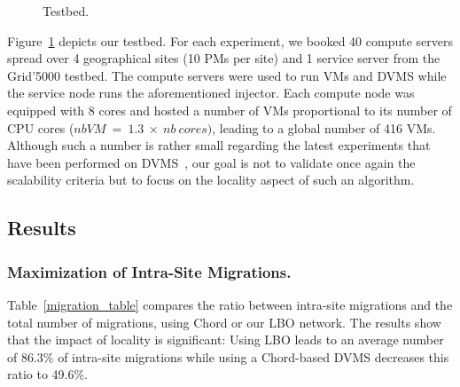 \begin{figure}
\begin{center}
\vspace*{-.6cm}
\caption{Testbed.\label{fig:g5kmap}}
\end{center}
\end{figure}
Figure~\ref{fig:g5kmap} depicts our testbed. 
For each experiment, we booked 40 compute servers spread over 4 geographical sites (10
PMs per site) and 1 service server from the Grid'5000 testbed. The compute servers
were used to run VMs and DVMS while the service node runs the aforementioned
injector.
%
Each compute node was equipped with 8 cores and hosted a number of VMs
proportional to its number of CPU cores ($nb VM\ =\ 1.3\ \times\ nb\ cores)$, leading to
a global number of 416 VMs. 
Although such a number is rather small regarding the latest
experiments that have been performed on DVMS~\cite{quesnel:ispa2013}, our goal is not to
validate once again the scalability criteria but to focus on the locality aspect of such
an algorithm.


\subsection{Results}

\subsubsection{Maximization of Intra-Site Migrations.}

Table~\ref{migration_table} compares the ratio between intra-site migrations and the total
number of migrations, using Chord or our LBO network. The results show that the impact of locality
is significant: Using LBO leads to an average number of 86.3\%
of intra-site migrations while using a Chord-based DVMS decreases this ratio to 49.6\%.


